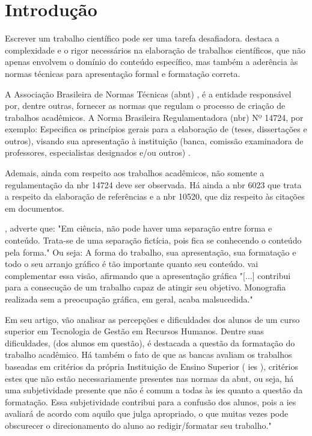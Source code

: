 \chapter{Introdução}

Escrever um trabalho científico pode ser uma tarefa desafiadora. \cite{severino}
destaca a complexidade e o rigor necessários na elaboração de trabalhos científicos, que não
apenas envolvem o domínio do conteúdo específico, mas também a aderência às normas
técnicas para apresentação formal e formatação correta.

A Associação Brasileira de Normas Técnicas 
(\acrshort{abnt})
, é a entidade responsável por,
dentre outras, fornecer as normas que regulam o processo de criação de trabalhos acadêmicos.
A Norma Brasileira Regulamentadora 
(\acrshort{nbr})
 Nº 14724, por exemplo: Especifica os princípios
gerais para a elaboração de (teses, dissertações e outros), visando sua apresentação à
instituição (banca, comissão examinadora de professores, especialistas designados e/ou
outros)
\cite{abnt}.

Ademais, ainda com respeito aos trabalhos acadêmicos, não somente a
regulamentação da 
\acrshort{nbr}
14724 deve ser observada. Há ainda a 
\acrshort{nbr}
6023 que trata a respeito
da elaboração de referências e a 
\acrshort{nbr}
10520, que diz respeito às citações em documentos.

\cite{castro}, adverte que: "Em ciência, não pode haver uma
separação entre forma e conteúdo. Trata-se de uma separação fictícia, pois fica se conhecendo
o conteúdo pela forma." Ou seja: A forma do trabalho, sua apresentação, sua formatação e
todo o seu arranjo gráfico é tão importante quanto seu conteúdo. 
\cite{medeiros} vai
complementar essa visão, afirmando que a apresentação gráfica "[...] contribui para a
consecução de um trabalho capaz de atingir seu objetivo. Monografia realizada sem a
preocupação gráfica, em geral, acaba malsucedida."

Em seu artigo, 
\cite{SilvaVitoria}
vão analisar as percepções e dificuldades dos
alunos de um curso superior em Tecnologia de Gestão em Recursos Humanos. Dentre suas
dificuldades, (dos alunos em questão), é destacada a questão da formatação do trabalho
acadêmico. Há também o fato de que as bancas avaliam os trabalhos baseadas em critérios da
própria Instituição de Ensino Superior (
\acrshort{ies}
), critérios estes que não estão necessariamente
presentes nas normas da \acrshort{abnt}, ou seja, há uma subjetividade presente que não é comum a
todas às \acrshort{ies} quanto a questão da formatação. Essa subjetividade contribui para a confusão dos
alunos, pois a \acrshort{ies} avaliará de acordo com aquilo que julga apropriado, o que muitas vezes
pode obscurecer o direcionamento do aluno ao redigir/formatar seu trabalho."


